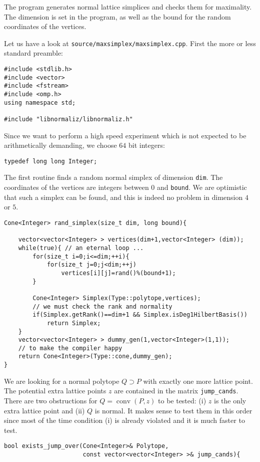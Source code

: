 \documentclass[12pt,a4paper]{scrartcl}
\theoremstyle{definition}
\begin{document}
\begin{small}
The program generates normal lattice simplices and checks them for maximality. The dimension is set in the program, as well as the bound for the random coordinates of the vertices.

Let us have a look at \verb|source/maxsimplex/maxsimplex.cpp|. First the more or less standard preamble:

\begin{Verbatim}
#include <stdlib.h>
#include <vector>
#include <fstream>
#include <omp.h>
using namespace std;

#include "libnormaliz/libnormaliz.h"
\end{Verbatim}

Since we want to perform a high speed experiment which is not expected to be arithmetically demanding, we choose $64$ bit integers:
\begin{Verbatim}
typedef long long Integer;
\end{Verbatim}

The first routine finds a random normal simplex of dimension \verb|dim|. The coordinates of the vertices are integers between $0$ and \verb|bound|. We are optimistic that such a simplex can be found, and this is indeed no problem in dimension $4$ or $5$.

\begin{Verbatim}
Cone<Integer> rand_simplex(size_t dim, long bound){

    vector<vector<Integer> > vertices(dim+1,vector<Integer> (dim));    
    while(true){ // an eternal loop ...
        for(size_t i=0;i<=dim;++i){
            for(size_t j=0;j<dim;++j)
                vertices[i][j]=rand()%(bound+1);            
        }

        Cone<Integer> Simplex(Type::polytope,vertices);
        // we must check the rank and normality
        if(Simplex.getRank()==dim+1 && Simplex.isDeg1HilbertBasis())
            return Simplex;        
    }
    vector<vector<Integer> > dummy_gen(1,vector<Integer>(1,1)); 
    // to make the compiler happy
    return Cone<Integer>(Type::cone,dummy_gen); 
}
\end{Verbatim}

We are looking for a normal polytope $Q\supset P$ with exactly one more lattice point. The potential extra lattice points $z$ are contained in the matrix \verb|jump_cands|. There are two obstructions for $Q=\operatorname{conv}(P,z)$ to be tested: (i) $z$ is the only extra lattice point and (ii) $Q$ is normal. It makes sense to test them in this order since most of the time condition (i) is already violated and it is much faster to test.
\begin{Verbatim}
bool exists_jump_over(Cone<Integer>& Polytope, 
                      const vector<vector<Integer> >& jump_cands){


\end{Verbatim}
\end{small}
\end{document}
